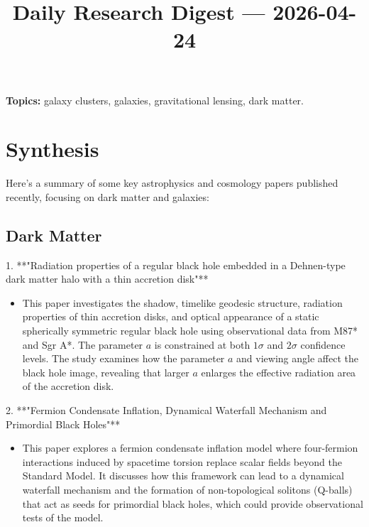 \documentclass[11pt]{article}
\begin{document}
\title{Daily Research Digest --- 2026-04-24}
\author{}
\date{}
\maketitle
\textbf{Topics:} galaxy clusters, galaxies, gravitational lensing, dark matter.
\section*{Synthesis}
Here's a summary of some key astrophysics and cosmology papers published recently, focusing on dark matter and galaxies:
\subsection*{Dark Matter}
1. **"Radiation properties of a regular black hole embedded in a Dehnen-type dark matter halo with a thin accretion disk"**
\begin{itemize}
\item This paper investigates the shadow, timelike geodesic structure, radiation properties of thin accretion disks, and optical appearance of a static spherically symmetric regular black hole using observational data from M87* and Sgr A*. The parameter $a$ is constrained at both $1\sigma $ and $2\sigma $ confidence levels. The study examines how the parameter $a$ and viewing angle affect the black hole image, revealing that larger $a$ enlarges the effective radiation area of the accretion disk.
\end{itemize}
2. **"Fermion Condensate Inflation, Dynamical Waterfall Mechanism and Primordial Black Holes"**
\begin{itemize}
\item This paper explores a fermion condensate inflation model where four-fermion interactions induced by spacetime torsion replace scalar fields beyond the Standard Model. It discusses how this framework can lead to a dynamical waterfall mechanism and the formation of non-topological solitons (Q-balls) that act as seeds for primordial black holes, which could provide observational tests of the model.
\end{itemize}
\end{document}
